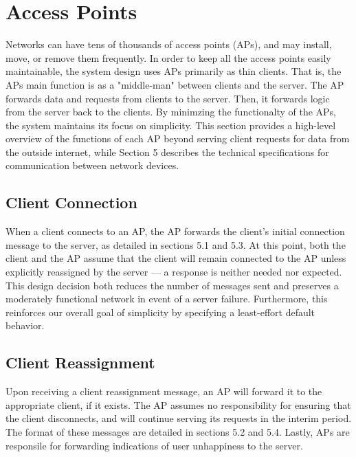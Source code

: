 \documentclass[10pt,journal,compsoc]{IEEEtran}
\begin{document}
		\section{Access Points}
		Networks can have tens of thousands of access points (APs), and may install, move, or remove them frequently. In order to keep all the access points easily maintainable, the system design uses APs primarily as thin clients. That is, the APs main function is as a "middle-man" between clients and the server. The AP forwards data and requests from clients to the server. Then, it forwards logic from the server back to the clients. By minimzing the functionalty of the APs, the system maintains its focus on simplicity. This section provides a high-level overview of the functions of each AP beyond serving client requests for data from the outside internet, while Section 5 describes the technical specifications for communication between network devices.
		
		\subsection{Client Connection}
		When a client connects to an AP, the AP forwards the client's initial connection message to the server, as detailed in sections 5.1 and 5.3. At this point, both the client and the AP assume that the client will remain connected to the AP unless explicitly reassigned by the server --- a response is neither needed nor expected. This design decision both reduces the number of messages sent and preserves a moderately functional network in event of a server failure. Furthermore, this reinforces our overall goal of simplicity by specifying a least-effort default behavior.
		
		\subsection{Client Reassignment}
		Upon receiving a client reassignment message, an AP will forward it to the appropriate client, if it exists. The AP assumes no responsibility for ensuring that the client disconnects, and will continue serving its requests in the interim period. The format of these messages are detailed in sections 5.2 and 5.4. Lastly, APs are responsile for forwarding indications of user unhappiness to the server.
		
\end{document}
